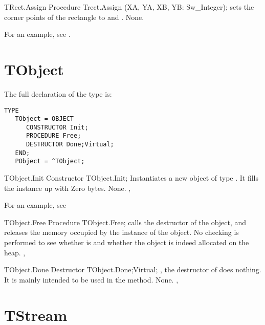 \html{}

\begin{procedure}{TRect.Assign}
\Declaration
Procedure Trect.Assign (XA, YA, XB, YB: Sw\_Integer);
\Description
{} sets the corner points of the rectangle to  and 
.
\Errors
None.
\end{procedure}

For an example, see .

\section{TObject}
\label{se:TObject}

The full declaration of the  type is:
\begin{verbatim}
TYPE
   TObject = OBJECT
      CONSTRUCTOR Init;
      PROCEDURE Free;
      DESTRUCTOR Done;Virtual;
   END;
   PObject = ^TObject;
\end{verbatim}
\begin{procedure}{TObject.Init}
\Declaration
Constructor TObject.Init;
\Description
Instantiates a new object of type . It fills the instance up
with Zero bytes.
\Errors
None.
\SeeAlso
{}, 
\end{procedure}

For an example, see 

\begin{procedure}{TObject.Free}
\Declaration
Procedure TObject.Free;
\Description
{} calls the destructor of the object, and releases the memory
occupied by the instance of the object.
\Errors
No checking is performed to see whether  is  and whether
the object is indeed allocated on the heap.
\SeeAlso
{}, 
\end{procedure}

\html{}

\begin{procedure}{TObject.Done}
\Declaration
Destructor TObject.Done;Virtual;
\Description
{}, the destructor of  does nothing. It is mainly
intended to be used in the  method.
\Errors
None.
\SeeAlso
{}, 
\end{procedure}

\section{TStream}
\label{se:TStream}

